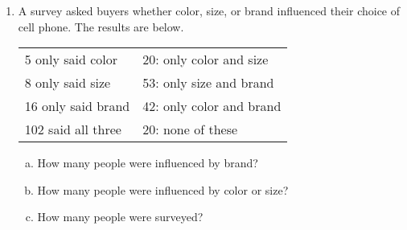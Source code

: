 \begin{enumerate}
\item A survey asked buyers whether color, size, or brand influenced their choice of cell phone.  The results are below.
\begin{center}
\begin{tabular}{l l}
5 only said color & 20: only color and size\\
8 only said size & 53: only size and brand\\
16 only said brand & 42: only color and brand\\
102 said all three & 20: none of these
\end{tabular}
\end{center}
\begin{enumerate}[(a)]
\item How many people were influenced by brand? 
\item How many people were influenced by color or size? 
\item How many people were surveyed? 
\end{enumerate}
\end{enumerate}